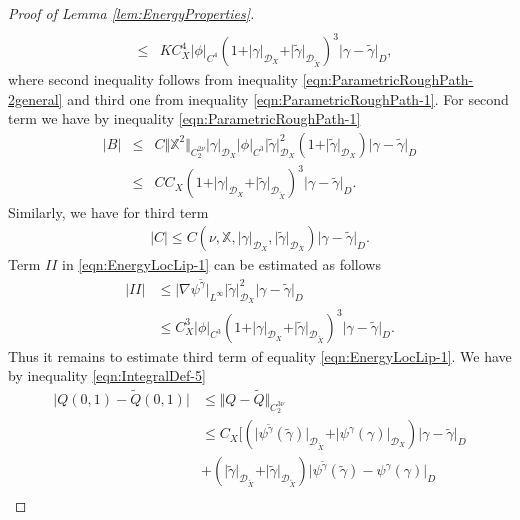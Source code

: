 \documentclass[11pt,a4paper,leqno]{amsart}%
\theoremstyle{plain}
\theoremstyle{remark}
\theoremstyle{plain}
\numberwithin{equation}{section}
\begin{document}
\begin{proof}[ Proof of Lemma \ref{lem:EnergyProperties}]
\begin{eqnarray}
\nonumber\\
&\leq&
KC_X^4\vert \phi\vert_{C^4}(1+\vert \gamma\vert_{\mathcal{D}_X}+\vert \tilde{\gamma}\vert_{\mathcal{D}_{\tilde{X}}})^3\vert \gamma-\tilde{\gamma}\vert_{D},
\nonumber
\end{eqnarray}
where second inequality follows from inequality
\eqref{eqn:ParametricRoughPath-2general} and third one from
inequality \eqref{eqn:ParametricRoughPath-1}. For second term we
have by inequality \eqref{eqn:ParametricRoughPath-1}
\begin{eqnarray}
\vert B\vert &\leq&
C\Vert \mathbb{X}^2\Vert_{C_2^{2\nu}}\vert \gamma\vert_{\mathcal{D}_X}\vert \phi\vert_{C^3}\vert \tilde{\gamma}\vert_{\mathcal{D}_X}^2
(1+\vert \tilde{\gamma}\vert_{\mathcal{D}_X})\vert \gamma-\tilde{\gamma}\vert_{D}
\nonumber
\\
&\leq& CC_X(1+\vert \gamma\vert_{\mathcal{D}_X}+\vert \tilde{\gamma}\vert_{\mathcal{D}_{\tilde{X}}})^3\vert \gamma-\tilde{\gamma}\vert_D.
\label{eqn:EnergyLocLip-4}
\end{eqnarray}
Similarly, we have for third term
\begin{eqnarray}
\vert C\vert \leq
C(\nu,\mathbb{X},\vert \gamma\vert_{\mathcal{D}_X},\vert \tilde{\gamma}\vert_{\mathcal{D}_X})\vert \gamma-\tilde{\gamma}\vert_{D}.\label{eqn:EnergyLocLip-5}
\end{eqnarray}
Term $II$ in \eqref{eqn:EnergyLocLip-1} can be estimated as
follows
\begin{align*}
\vert II\vert &\leq
\vert \nabla\psi^{\tilde{\gamma}}\vert_{L^{\infty}}\vert \tilde{\gamma}\vert_{\mathcal{D}_X}^2\vert \gamma-\tilde{\gamma}\vert_D\\
&\leq
C_X^3\vert \phi\vert_{C^3}(1+\vert \gamma\vert_{\mathcal{D}_X}+\vert \tilde{\gamma}\vert_{\mathcal{D}_{\tilde{X}}})^3\vert \gamma-\tilde{\gamma}\vert_D.
\end{align*}
Thus it remains to estimate third term of equality
\eqref{eqn:EnergyLocLip-1}. We have by inequality
\eqref{eqn:IntegralDef-5}
\begin{align*}
\vert Q(0,1)-\tilde{Q}(0,1)\vert &\leq \Vert Q-\tilde{Q}\Vert_{C_2^{3\nu}}\\
&\leq
C_X\Big[(\vert \psi^{\tilde{\gamma}}(\tilde{\gamma})\vert_{\mathcal{D}_{\tilde{X}}}+
\vert \psi^{\gamma}(\gamma)\vert_{\mathcal{D}_X})\vert \gamma-\tilde{\gamma}\vert_D\\
&+(\vert \tilde{\gamma}\vert_{\mathcal{D}_{\tilde{X}}}+\vert \tilde{\gamma}\vert_{\mathcal{D}_{\tilde{X}}})\vert \psi^{\tilde{\gamma}}(\tilde{\gamma})-\psi^{\gamma}(\gamma)\vert_D\\

\end{align*}
\end{proof}
\end{document}
